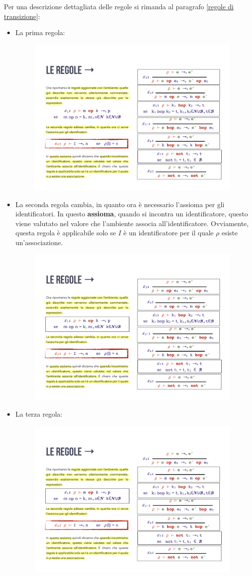 \documentclass[a4paper]{article}
\begin{document}
	Per una descrizione dettagliata delle regole si rimanda al paragrafo \ref{regole di transizione}:
	\begin{itemize}
		\item La prima regola:
		\begin{figure}[!htp]
			\centering
			\includegraphics[width=.6\textwidth]{img/regola_espressione-1.pdf}
		\end{figure}
		
		\item La seconda regola cambia, in quanto ora è necessario l'assioma per gli identificatori. In questo \textbf{assioma}, quando si incontra un identificatore, questo viene valutato nel valore che l'ambiente associa all'identificatore. Ovviamente, questa regola è applicabile solo se $I$ è un identificatore per il quale $\rho$ esiste un'associazione.
		\begin{figure}[!htp]
			\centering
			\includegraphics[width=.6\textwidth]{img/regola_espressione-2.pdf}
		\end{figure}
		
		\item La terza regola:
		\begin{figure}[!htp]
			\centering
			\includegraphics[width=.6\textwidth]{img/regola_espressione-3.pdf}
		\end{figure}
		

\end{itemize}
\end{document}
